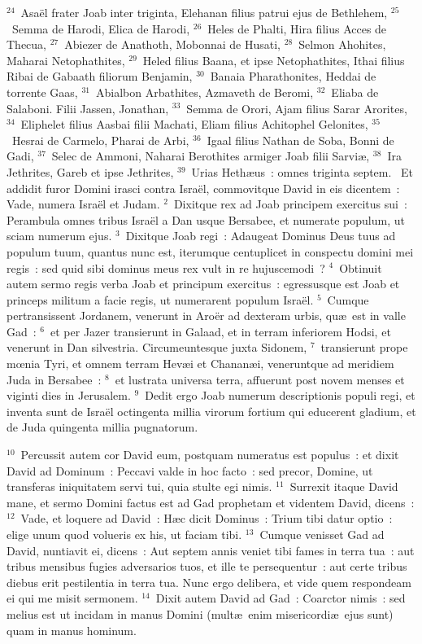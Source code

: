 ${}^{24}$~Asa\"el frater Joab inter triginta, Elehanan filius patrui ejus de Bethlehem,
${}^{25}$~Semma de Harodi, Elica de Harodi,
${}^{26}$~Heles de Phalti, Hira filius Acces de Thecua,
${}^{27}$~Abiezer de Anathoth, Mobonnai de Husati,
${}^{28}$~Selmon Ahohites, Maharai Netophathites,
${}^{29}$~Heled filius Baana, et ipse Netophathites, Ithai filius Ribai de Gabaath filiorum Benjamin,
${}^{30}$~Banaia Pharathonites, Heddai de torrente Gaas,
${}^{31}$~Abialbon Arbathites, Azmaveth de Beromi,
${}^{32}$~Eliaba de Salaboni. Filii Jassen, Jonathan,
${}^{33}$~Semma de Orori, Ajam filius Sarar Arorites,
${}^{34}$~Eliphelet filius Aasbai filii Machati, Eliam filius Achitophel Gelonites,
${}^{35}$~Hesrai de Carmelo, Pharai de Arbi,
${}^{36}$~Igaal filius Nathan de Soba, Bonni de Gadi,
${}^{37}$~Selec de Ammoni, Naharai Berothites armiger Joab filii Sarvi\ae ,
${}^{38}$~Ira Jethrites, Gareb et ipse Jethrites,
${}^{39}$~Urias Heth\ae us~: omnes triginta septem.
~Et addidit furor Domini irasci contra Isra\"el, commovitque David in eis dicentem~: Vade, numera Isra\"el et Judam.
${}^{2}$~Dixitque rex ad Joab principem exercitus sui~: Perambula omnes tribus Isra\"el a Dan usque Bersabee, et numerate populum, ut sciam numerum ejus.
${}^{3}$~Dixitque Joab regi~: Adaugeat Dominus Deus tuus ad populum tuum, quantus nunc est, iterumque centuplicet in conspectu domini mei regis~: sed quid sibi dominus meus rex vult in re hujuscemodi~?
${}^{4}$~Obtinuit autem sermo regis verba Joab et principum exercitus~: egressusque est Joab et princeps militum a facie regis, ut numerarent populum Isra\"el.
${}^{5}$~Cumque pertransissent Jordanem, venerunt in Aro\"er ad dexteram urbis, qu\ae\ est in valle Gad~:
${}^{6}$~et per Jazer transierunt in Galaad, et in terram inferiorem Hodsi, et venerunt in Dan silvestria. Circumeuntesque juxta Sidonem,
${}^{7}$~transierunt prope mœnia Tyri, et omnem terram Hev\ae i et Chanan\ae i, veneruntque ad meridiem Juda in Bersabee~:
${}^{8}$~et lustrata universa terra, affuerunt post novem menses et viginti dies in Jerusalem.
${}^{9}$~Dedit ergo Joab numerum descriptionis populi regi, et inventa sunt de Isra\"el octingenta millia virorum fortium qui educerent gladium, et de Juda quingenta millia pugnatorum.


${}^{10}$~Percussit autem cor David eum, postquam numeratus est populus~: et dixit David ad Dominum~: Peccavi valde in hoc facto~: sed precor, Domine, ut transferas iniquitatem servi tui, quia stulte egi nimis.
${}^{11}$~Surrexit itaque David mane, et sermo Domini factus est ad Gad prophetam et videntem David, dicens~:
${}^{12}$~Vade, et loquere ad David~: H\ae c dicit Dominus~: Trium tibi datur optio~: elige unum quod volueris ex his, ut faciam tibi.
${}^{13}$~Cumque venisset Gad ad David, nuntiavit ei, dicens~: Aut septem annis veniet tibi fames in terra tua~: aut tribus mensibus fugies adversarios tuos, et ille te persequentur~: aut certe tribus diebus erit pestilentia in terra tua. Nunc ergo delibera, et vide quem respondeam ei qui me misit sermonem.
${}^{14}$~Dixit autem David ad Gad~: Coarctor nimis~: sed melius est ut incidam in manus Domini (mult\ae\ enim misericordi\ae\ ejus sunt) quam in manus hominum.


